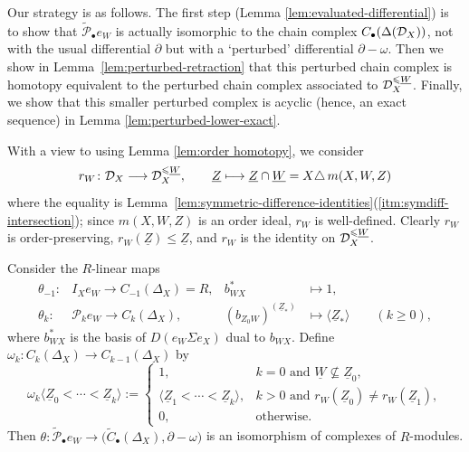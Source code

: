 \documentclass[a4paper,leqno]{amsart}
\begin{document}
Our strategy is as follows.  The first step (Lemma \ref{lem:evaluated-differential}) is to show that $\widetilde{\mathcal P}_\bullet e_W$ is actually isomorphic to the chain complex $C_\bullet(\Delta(\mathcal D_X))$, not with the usual differential $\partial$ but with a `perturbed'  differential $\partial-\omega$.  Then we show in Lemma~\ref{lem:perturbed-retraction} that this perturbed chain complex is homotopy equivalent to the perturbed chain complex associated to $\mathcal D_X^{\leqslant \underline{W}}$.  Finally, we show that this smaller perturbed complex is acyclic (hence, an exact sequence) in Lemma \ref{lem:perturbed-lower-exact}.

With a view to using Lemma \ref{lem:order homotopy}, we consider
\[
r_W\colon\mathcal D_X\longrightarrow\mathcal D_X^{\leqslant\underline{W}},\qquad
 \underline{Z}\longmapsto\underline{Z}\cap\underline{W}=X{\mathbin{\triangle}}\,m(X,W,Z)
\]
where the equality is Lemma~\ref{lem:symmetric-difference-identities}\textup{(\ref{itm:symdiff-intersection})}; since $m(X,W,Z)$ is an order ideal, $r_W$ is well-defined. Clearly $r_W$ is order-preserving, $r_W(\underline{Z})\leq\underline{Z}$, and $r_W$ is the identity on $\mathcal D_X^{\leqslant\underline{W}}$.

\begin{lem}\label{lem:evaluated-differential}
Consider the $R$-linear maps
\begin{align*}
\theta_{-1}\colon &I_Xe_W\to C_{-1}(\Delta_X)=R, & b_{WX}^* &\mapsto 1, \\
\theta_k\colon& \mathcal P_ke_W\to C_k(\Delta_X), & (b_{Z_0W})^{(\underline{Z}_\ast)}&\mapsto\langle\underline{Z}_\ast\rangle \qquad (k\ge 0),
\end{align*} 
where $b_{WX}^*$ is the basis of $D(e_W\Sigma e_X)$ dual to $b_{WX}$.
Define $\omega_k\colon C_k(\Delta_X)\to C_{k-1}(\Delta_X)$ by
\[
 \omega_k\langle\underline{Z}_0<\cdots<\underline{Z}_k\rangle:=
 \begin{cases}
 1, & k=0 \text{ and } \underline{W}\not\subseteq \underline{Z}_0,\\
 \langle\underline{Z}_1<\cdots<\underline{Z}_k\rangle, & k>0 \text{ and } r_W(\underline{Z}_0)\neq r_W(\underline{Z}_1),\\
 0, & \text{otherwise}.
 \end{cases}
\]
Then $\theta\colon\widetilde{\mathcal P}_\bullet e_W\to\bigl(\widetilde C_\bullet(\Delta_X),\partial-\omega\bigr)$ is an isomorphism of complexes of $R$-modules.
\end{lem}
\end{document}
